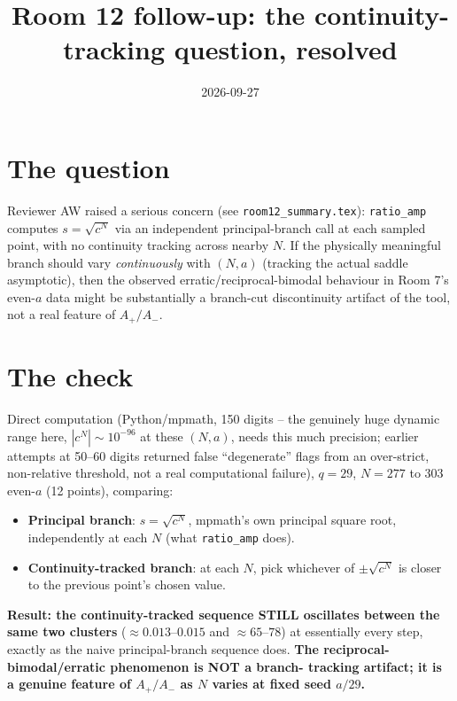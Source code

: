 \documentclass[11pt]{article}
\title{Room 12 follow-up: the continuity-tracking question, resolved}
\date{2026-09-27}
\begin{document}
\maketitle

\section*{The question}
Reviewer AW raised a serious concern (see \texttt{room12\_summary.tex}): \texttt{ratio\_amp}
computes $s=\sqrt{c^N}$ via an independent principal-branch call at each sampled point, with no
continuity tracking across nearby $N$. If the physically meaningful branch should vary
\emph{continuously} with $(N,a)$ (tracking the actual saddle asymptotic), then the observed
erratic/reciprocal-bimodal behaviour in Room 7's even-$a$ data might be substantially a branch-cut
discontinuity artifact of the tool, not a real feature of $A_+/A_-$.

\section*{The check}
Direct computation (Python/mpmath, 150 digits -- the genuinely huge dynamic range here,
$|c^N|\sim10^{-96}$ at these $(N,a)$, needs this much precision; earlier attempts at 50--60 digits
returned false ``degenerate'' flags from an over-strict, non-relative threshold, not a real
computational failure), $q=29$, $N=277$ to $303$ even-$a$ (12 points), comparing:
\begin{itemize}
\item \textbf{Principal branch}: $s=\sqrt{c^N}$, mpmath's own principal square root, independently
at each $N$ (what \texttt{ratio\_amp} does).
\item \textbf{Continuity-tracked branch}: at each $N$, pick whichever of $\pm\sqrt{c^N}$ is closer
to the previous point's chosen value.
\end{itemize}

\textbf{Result: the continuity-tracked sequence STILL oscillates between the same two clusters}
($\approx0.013$--$0.015$ and $\approx65$--$78$) at essentially every step, exactly as the naive
principal-branch sequence does. \textbf{The reciprocal-bimodal/erratic phenomenon is NOT a branch-
tracking artifact; it is a genuine feature of $A_+/A_-$ as $N$ varies at fixed seed $a/29$.}
\end{document}
